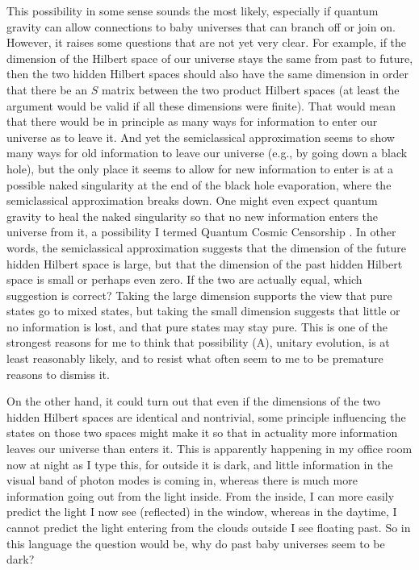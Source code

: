      This possibility in some sense sounds the most likely,
especially if
quantum gravity can allow connections to baby universes that can
branch off or
join on.  However, it raises some questions that are not yet very
clear.  For
example, if the dimension of the Hilbert space of our universe stays
the same
from past to future, then the two hidden Hilbert spaces should also
have the
same dimension in order that there be an $S$ matrix between the two
product
Hilbert spaces (at least the argument would be valid if all these
dimensions
were finite).  That would mean that there would be in principle as
many ways
for information to enter our universe as to leave it.  And yet the
semiclassical approximation seems to show many ways for old
information to
leave our universe (e.g., by going down a black hole), but the only
place it
seems to allow for new information to enter is at a possible naked
singularity
at the end of the black hole evaporation, where the semiclassical
approximation
breaks down.  One might even expect quantum gravity to heal the naked
singularity so that no new information enters the universe from it, a
possibility
I termed Quantum Cosmic Censorship \cite{Pag80}.  In other
words, the semiclassical approximation suggests that the dimension of
the
future hidden Hilbert space is large, but that the dimension of the
past hidden
Hilbert space is small or perhaps even zero.  If the two are actually
equal,
which suggestion is correct?  Taking the large dimension supports the
view that
pure states go to mixed states, but taking the small dimension
suggests that
little or no information is lost, and that pure states may stay pure.
This is
one of the strongest reasons for me to think that possibility (A),
unitary
evolution, is at least reasonably likely, and to resist what often
seem to me
to be premature reasons to dismiss it.

     On the other hand, it could turn out that even if the dimensions
of the
two hidden Hilbert spaces are identical and nontrivial, some
principle
influencing the states on those two spaces might make it so that in
actuality
more information leaves our universe than enters it.  This is
apparently
happening in my office room now at night as I type this, for outside
it is
dark, and little information in the visual band of photon modes is
coming in,
whereas there is much more information going out from the light
inside.  From
the inside, I can more easily predict the light I now see (reflected)
in the
window, whereas in the daytime, I cannot predict the light entering
from the
clouds outside I see floating past.  So in this language the question
would be,
why do past baby universes seem to be dark?

